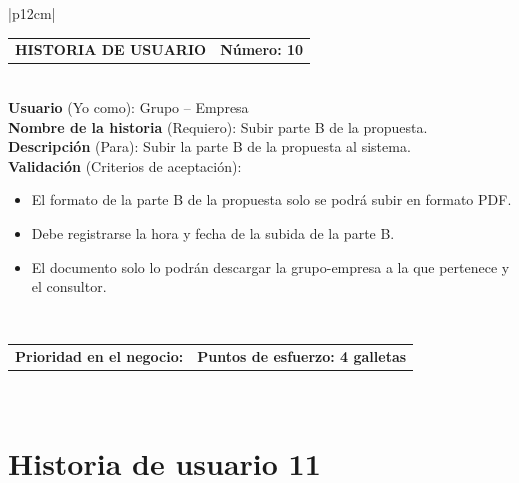 \documentclass[11pt,letterpaper]{report}
\begin{document}
	\begin{center}	
		\begin{tabular}{|p{12cm}|}
			\hline
			\begin{tabular}{c|c}
				\textbf{HISTORIA DE USUARIO} & \textbf{Número: 10} \\
			\end{tabular} \\ \hline
			\textbf{Usuario} (Yo como): Grupo – Empresa \\ \hline
			\textbf{Nombre de la historia} (Requiero): Subir parte B de la propuesta.  \\ \hline
			\textbf{Descripción} (Para): Subir la parte B de la propuesta al
			sistema. \\ \hline
			\textbf{Validación} (Criterios de aceptación): \\
			\begin{minipage}{12cm}
				\begin{itemize}
					\item El formato de la parte B de la propuesta solo se podrá subir en formato PDF.
					\item Debe registrarse la hora y fecha de la subida de la parte B.
					\item El documento solo lo podrán descargar la grupo-empresa a la que pertenece y el consultor.
				\end{itemize}
			\end{minipage} \\ \hline
			\begin{tabular}{p{6cm}|c}
				\textbf{Prioridad en el negocio: } & \textbf{Puntos de esfuerzo: 4 galletas} \\
			\end{tabular} \\ \hline
		\end{tabular}
	\end{center}
	
	\section{Historia de usuario 11}
	
\end{document}
